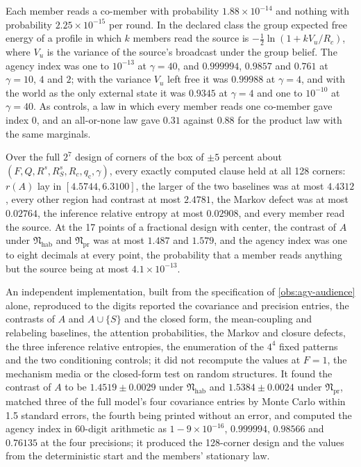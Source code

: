 \begin{numcheck}
Each member reads a co-member with probability $1.88\times10^{-14}$ and nothing with probability $2.25\times10^{-15}$ per round. In the declared class the group expected free energy of a profile in which $k$ members read the source is $-\frac12\ln(1+kV_u/R_c)$, where $V_u$ is the variance of the source's broadcast under the group belief. The agency index was one to $10^{-13}$ at $\gamma=40$, and $0.999994$, $0.9857$ and $0.761$ at $\gamma=10$, $4$ and $2$; with the variance $V_u$ left free it was $0.99988$ at $\gamma=4$, and with the world as the only external state it was $0.9345$ at $\gamma=4$ and one to $10^{-10}$ at $\gamma=40$. As controls, a law in which every member reads one co-member gave index $0$, and an all-or-none law gave $0.31$ against $0.88$ for the product law with the same marginals.

Over the full $2^7$ design of corners of the box of $\pm5$ percent about $(F,Q,R^s,R^s_S,R_c,q_{\mathrm c},\gamma)$, every exactly computed clause held at all 128 corners: $r(A)$ lay in $[4.5744,6.3100]$, the larger of the two baselines was at most $4.4312$, every other region had contrast at most $2.4781$, the Markov defect was at most $0.02764$, the inference relative entropy at most $0.02908$, and every member read the source. At the 17 points of a fractional design with center, the contrast of $A$ under $\mathfrak N_{\mathrm{hab}}$ and $\mathfrak N_{\mathrm{pr}}$ was at most $1.487$ and $1.579$, and the agency index was one to eight decimals at every point, the probability that a member reads anything but the source being at most $4.1\times10^{-13}$.

An independent implementation, built from the specification of \cref{obs:agy-audience} alone, reproduced to the digits reported the covariance and precision entries, the contrasts of $A$ and $A\cup\{S\}$ and the closed form, the mean-coupling and relabeling baselines, the attention probabilities, the Markov and closure defects, the three inference relative entropies, the enumeration of the $4^4$ fixed patterns and the two conditioning controls; it did not recompute the values at $F=1$, the mechanism media or the closed-form test on random structures. It found the contrast of $A$ to be $1.4519\pm0.0029$ under $\mathfrak N_{\mathrm{hab}}$ and $1.5384\pm0.0024$ under $\mathfrak N_{\mathrm{pr}}$, matched three of the full model's four covariance entries by Monte Carlo within 1.5 standard errors, the fourth being printed without an error, and computed the agency index in 60-digit arithmetic as $1-9\times10^{-16}$, $0.999994$, $0.98566$ and $0.76135$ at the four precisions; it produced the 128-corner design and the values from the deterministic start and the members' stationary law.


\end{numcheck}
